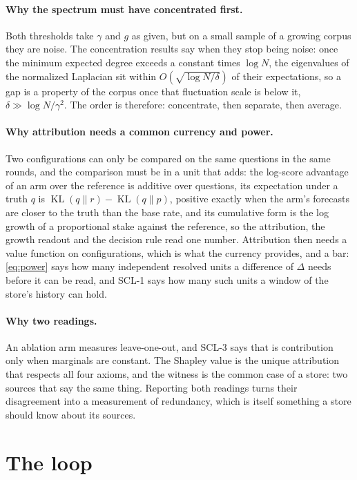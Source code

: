 \documentclass[11pt,a4paper]{article}
\theoremstyle{plain}
\theoremstyle{definition}
\theoremstyle{remark}
\DeclareMathOperator{\KL}{KL}
\begin{document}
\paragraph{Why the spectrum must have concentrated first.}
Both thresholds take $\gamma$ and $g$ as given, but on a small sample of a growing corpus they are
noise. The concentration results say when they stop being noise: once the minimum expected degree
exceeds a constant times $\log N$, the eigenvalues of the normalized Laplacian sit within
$O(\sqrt{\log N/\delta})$ of their expectations, so a gap is a property of the corpus once that
fluctuation scale is below it, $\delta \gg \log N/\gamma^2$. The order is therefore: concentrate,
then separate, then average.

\paragraph{Why attribution needs a common currency and power.}
Two configurations can only be compared on the same questions in the same rounds, and the
comparison must be in a unit that adds: the log-score advantage of an arm over the reference is
additive over questions, its expectation under a truth $q$ is $\KL(q\|r) - \KL(q\|p)$, positive
exactly when the arm's forecasts are closer to the truth than the base rate, and its cumulative form
is the log growth of a proportional stake against the reference, so the attribution, the growth
readout and the decision rule read one number. Attribution then needs a value function on
configurations, which is what the currency provides, and a bar: \eqref{eq:power} says how many
independent resolved units a difference of $\Delta$ needs before it can be read, and SCL-1 says how
many such units a window of the store's history can hold.

\paragraph{Why two readings.}
An ablation arm measures leave-one-out, and SCL-3 says that is contribution only when marginals are
constant. The Shapley value is the unique attribution that respects all four axioms, and the witness
is the common case of a store: two sources that say the same thing. Reporting both readings turns
their disagreement into a measurement of redundancy, which is itself something a store should know
about its sources.

\section{The loop}\label{sec:loop}
\end{document}
